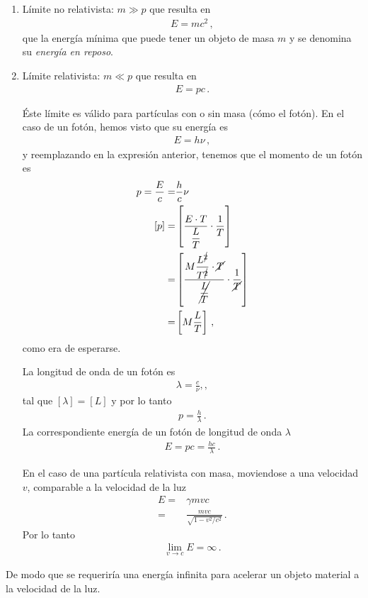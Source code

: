 \documentclass[11pt,a4paper]{article}
\begin{document}
\begin{enumerate}
    \item Límite no relativista: $m\gg p$ que resulta en 
    \begin{align*}
        E = m c^2\,,
    \end{align*}
    que la energía mínima que puede tener un objeto de masa $m$ y se denomina su \emph{energía en reposo}.
    \item Límite relativista: $m \ll p$ que resulta en
    \begin{align*}
        E = pc\,.
    \end{align*}

    Éste límite es válido para partículas con o sin masa (cómo el fotón).  En el caso de un fotón, hemos visto que su energía es 
    \begin{align}
        E=h\nu\,,
    \end{align}
    y reemplazando en la expresión anterior, tenemos que el momento de un fotón es 
    \begin{align}
        p=\frac{E}{c} =& \frac{h}{c}\nu\\
        [p] =& \left[\frac{E\cdot T}{\dfrac{L}{T}}\cdot \frac{1}{T}\right]\nonumber\\
         =& \left[\frac{M \dfrac{L^{\cancel{2}}}{T^{\cancel{2}}}\cdot \cancel{T}}{\cancel{\dfrac{L}{T}}}\cdot \frac{1}{\cancel{T}}\right]\nonumber\\
        = &\left[M \frac{L}{T}\right]\,,
    \end{align}
    como era de esperarse. 

    La longitud de onda de un fotón es
    \begin{align}
        \lambda =\frac{c}{\nu},,
    \end{align}
tal que $[\lambda] = [L]$ y por lo tanto
\begin{align}
    p =\frac{h}{\lambda}\,.
\end{align}
La correspondiente energía de un fotón de longitud de onda $\lambda$
\begin{align}
E = pc =\frac{hc}{\lambda}\,.    
\end{align}

    En el caso de una partícula relativista con masa, moviendose a una velocidad $v$, comparable a la velocidad de la luz
    \begin{align}
        E =&\gamma m v c \nonumber\\
        =& \frac{mvc}{\sqrt{1-v^2/c^2}}\,.
    \end{align}
    Por lo tanto
    \begin{align}
        \lim_{v\to c} E = \infty\,.
    \end{align}
\end{enumerate}
De modo que se requeriría  una energía infinita para acelerar un objeto material a la velocidad de la luz. 
\end{document}
